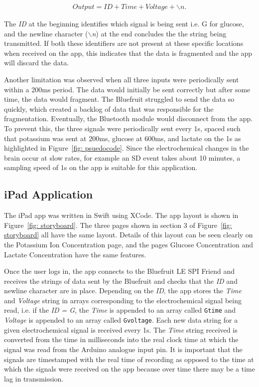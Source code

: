 \begin{align}
    Output = ID + Time + Voltage + \backslash n.
    \nonumber
\end{align}

The \textit{ID} at the beginning identifies which signal is being sent i.e. G for glucose, and the newline character (\textit{$\backslash$n}) at the end concludes the the string being transmitted. If both these identifiers are not present at these specific locations when received on the app, this indicates that the data is fragmented and the app will discard the data. 

Another limitation was observed when all three inputs were periodically sent within a 200ms period. The data would initially be sent correctly but after some time, the data would fragment. The Bluefruit struggled to send the data so quickly, which created a backlog of data that was responsible for the fragmentation. Eventually, the Bluetooth module would disconnect from the app. To prevent this, the three signals were periodically sent every 1s, spaced such that potassium was sent at 200ms, glucose at 600ms, and lactate on the 1s as highlighted in Figure~\ref{fig: psuedocode}. Since the electrochemical changes in the brain occur at slow rates, for example an SD event takes about 10 minutes, a sampling speed of 1s on the app is suitable for this application. 





\subsection{iPad Application}
The iPad app was written in Swift using XCode. The app layout is shown in Figure~\ref{fig: storyboard}. The three pages shown in section 3 of Figure~\ref{fig: storyboard} all have the same layout. Details of this layout can be seen clearly on the Potassium Ion Concentration page, and the pages Glucose Concentration and Lactate Concentration have the same features. 

Once the user logs in, the app connects to the Bluefruit LE SPI Friend and receives the strings of data sent by the Bluefruit and checks that the \textit{ID} and newline character are in place. Depending on the \textit{ID}, the app stores the \textit{Time} and \textit{Voltage} string in arrays corresponding to the electrochemical signal being read, i.e. if the \textit{ID = G}, the \textit{Time} is appended to an array called  {\tt{Gtime}} and \textit{Voltage} is appended to an array called {\tt{Gvoltage}}. Each new data string for a given electrochemical signal is received every 1s. The \textit{Time} string received is converted from the time in milliseconds into the real clock time at which the signal was read from the Arduino analogue input pin. It is important that the signals are timestamped with the real time of recording as opposed to the time at which the signals were received on the app because over time there may be a time lag in transmission.

